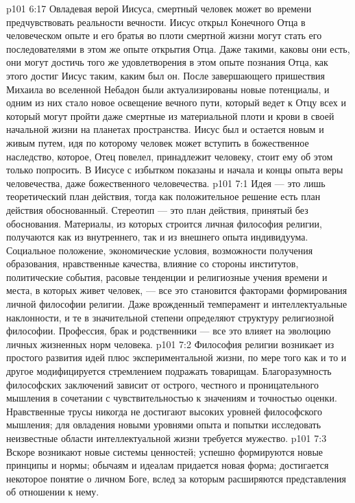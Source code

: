 \vs p101 6:17 Овладевая верой Иисуса, смертный человек может во времени предчувствовать реальности вечности. Иисус открыл Конечного Отца в человеческом опыте и его братья во плоти смертной жизни могут стать его последователями в этом же опыте открытия Отца. Даже такими, каковы они есть, они могут достичь того же удовлетворения в этом опыте познания Отца, как этого достиг Иисус таким, каким был он. После завершающего пришествия Михаила во вселенной Небадон были актуализированы новые потенциалы, и одним из них стало новое освещение вечного пути, который ведет к Отцу всех и который могут пройти даже смертные из материальной плоти и крови в своей начальной жизни на планетах пространства. Иисус был и остается новым и живым путем, идя по которому человек может вступить в божественное наследство, которое, Отец повелел, принадлежит человеку, стоит ему об этом только попросить. В Иисусе с избытком показаны и начала и концы опыта веры человечества, даже божественного человечества.
\vs p101 7:1 Идея --- это лишь теоретический план действия, тогда как положительное решение есть план действия обоснованный. Стереотип --- это план действия, принятый без обоснования. Материалы, из которых строится личная философия религии, получаются как из внутреннего, так и из внешнего опыта индивидуума. Социальное положение, экономические условия, возможности получения образования, нравственные качества, влияние со стороны институтов, политические события, расовые тенденции и религиозные учения времени и места, в которых живет человек, --- все это становится факторами формирования личной философии религии. Даже врожденный темперамент и интеллектуальные наклонности, и те в значительной степени определяют структуру религиозной философии. Профессия, брак и родственники --- все это влияет на эволюцию личных жизненных норм человека.
\vs p101 7:2 Философия религии возникает из простого развития идей плюс экспериментальной жизни, по мере того как и то и другое модифицируется стремлением подражать товарищам. Благоразумность философских заключений зависит от острого, честного и проницательного мышления в сочетании с чувствительностью к значениям и точностью оценки. Нравственные трусы никогда не достигают высоких уровней философского мышления; для овладения новыми уровнями опыта и попытки исследовать неизвестные области интеллектуальной жизни требуется мужество.
\vs p101 7:3 Вскоре возникают новые системы ценностей; успешно формируются новые принципы и нормы; обычаям и идеалам придается новая форма; достигается некоторое понятие о личном Боге, вслед за которым расширяются представления об отношении к нему.

